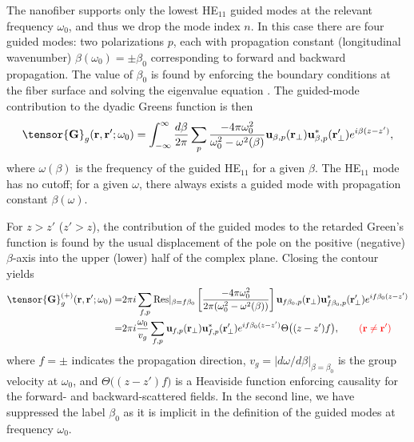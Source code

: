 \documentclass[preprint,aps,pra,onecolumn]{revtex4-1} %
\newcommand{\error}[1]{{\color{red} #1}}
\begin{document}
The nanofiber supports only the lowest HE$_{11}$ guided modes \cite{Yariv} at the relevant frequency $\omega_0$, and thus we drop the mode index $n$.  In this case there are four guided modes: two polarizations $p$, each with propagation constant (longitudinal wavenumber) $\beta(\omega_0) = \pm\beta_0$ corresponding to forward and backward propagation.  The value of $\beta_0$ is found by enforcing the boundary conditions at the fiber surface and solving the eigenvalue equation \cite{Yariv, Marcuse, SnyderLove}. The guided-mode contribution to the dyadic Greens function is then 
	\begin{equation} \label{Eq::GreensEigenmodes}
		\tensor{\mathbf{G}}_g(\br,\br'; \omega_0) = \int_{-\infty}^\infty \frac{d \beta}{2 \pi} \sum_{p} 
\frac{-4\pi\omega_0^2}{\omega_0^2-\omega^2(\beta)} \mathbf{u}_{\beta,p} (\br_\perp)\mathbf{u}^*_{\beta,p} 
(\br_{\perp}^\prime) e^{i\beta(z-z')},
	\end{equation}
where $ \omega(\beta)$ is the frequency of the guided HE$_{11}$ for a given $\beta$.  The 
HE$_{11}$ mode has no cutoff; for a given $\omega$, there always exists a guided mode with propagation 
constant $\beta(\omega)$.  

For $z>z'$ ($z'>z$), the contribution of the guided modes to the retarded Green's function is found by the 
usual displacement of the pole on the positive (negative) $\beta$-axis into the upper (lower) half of 
the complex plane. Closing the contour yields \cite{manga_rao_single_2007}
	\begin{align} 
		\tensor{\mathbf{G}}^{(+)}_g(\br,\br'; \omega_0) = &2\pi i \sum_{f,p}  {\rm Res}\vert_{\beta =f\beta_0} 
\left[\frac{-4\pi \omega_0^2 }{2\pi ( \omega_0^2-\omega^2(\beta))}\right]  \mathbf{u}_{f\beta_0, p} 
(\br_\perp)\mathbf{u}^*_{f\beta_0, p} (\br_{\perp}^\prime)e^{if \beta_0 (z-z')} \nonumber \\
= & 2\pi i \frac{\omega_0}{v_g } \sum_{f,p} \mathbf{u}_{f, p} (\br_\perp)\mathbf{u}^*_{f , p} 
(\br_{\perp}^\prime) e^{i f \beta_0(z-z')} \Theta \big( (z-z')f \big), \quad \quad \error{(\mbf{r} \neq \mbf{r}')} \label{Eq::GreensGuided}
	\end{align}
where $f=\pm$ indicates the propagation direction, $v_g= \vert d\omega/d\beta \vert_{\beta=\beta_0}$ is the group velocity at $\omega_0$, and $\Theta \big( (z-z')f \big)$ is a Heaviside function enforcing causality for the forward- and backward-scattered fields. In the second line, we have suppressed the label $\beta_0$ as it is implicit in the definition of the guided modes at frequency $\omega_0$. 
\end{document}
